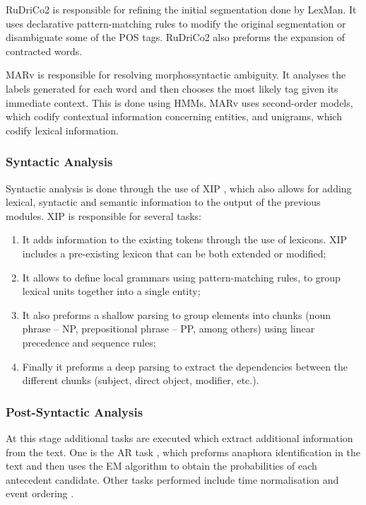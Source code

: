 \ac{RuDriCo2} is responsible for refining the initial segmentation done by
LexMan. It uses declarative pattern-matching rules to modify the original
segmentation or disambiguate some of the \ac{POS} tags. \ac{RuDriCo2} also
preforms the expansion of contracted words.

\ac{MARv} is responsible for resolving morphossyntactic ambiguity. It analyses
the labels generated for each word and then chooses the most likely tag given
its immediate context. This is done using \acp{HMM}. \ac{MARv} uses
second-order models, which codify contextual information concerning entities,
and unigrams, which codify lexical information.

\subsubsection*{Syntactic Analysis}

Syntactic analysis is done through the use of \ac{XIP} \cite{ait2002robustness},
which also allows for adding lexical, syntactic and semantic information to the
output of the previous modules. \ac{XIP} is responsible for several tasks:

\begin{enumerate}[label=(\roman*)]
 \item It adds information to the existing tokens through the use of lexicons.
\ac{XIP} includes a pre-existing lexicon that can be both extended or modified;
 \item It allows to define local grammars using pattern-matching rules, to group
lexical units together into a single entity;
 \item It also preforms a shallow parsing to group elements into chunks (noun
 phrase -- NP, prepositional phrase -- PP, among others) using linear precedence
 and sequence rules;
 \item Finally it preforms a deep parsing to extract the dependencies between the
different chunks (subject, direct object, modifier, etc.).
\end{enumerate}

\subsubsection*{Post-Syntactic Analysis}

At this stage additional tasks are executed which extract additional information
from the text. One is the \ac{AR} task \cite{marques2013anaphora}, which
preforms anaphora identification in the text and then uses the \ac{EM} algorithm
to obtain the probabilities of each antecedent candidate. Other tasks performed
include time normalisation \cite{mauricio2011normalizacao} and event ordering
\cite{cabrita2014ordenar}.

